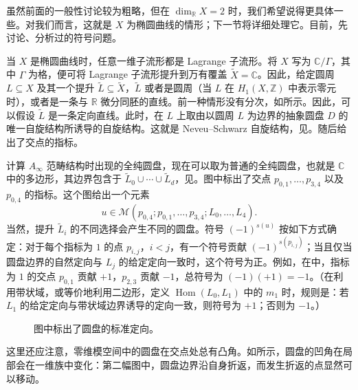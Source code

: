 虽然前面的一般性讨论较为粗略，但在 $\dim_{\mathbb R}X=2$ 时，我们希望说得更具体一些。对我们而言，这就是 $X$ 为椭圆曲线的情形；下一节将详细处理它。目前，先讨论、分析过的符号问题。

当 $X$ 是椭圆曲线时，任意一维子流形都是 Lagrange 子流形。将 $X$ 写为 $\mathbb C/\Gamma$，其中 $\Gamma$ 为格，便可将 Lagrange 子流形提升到万有覆盖 $\widetilde X=\mathbb C$。因此，给定圆周 $L\subseteq X$ 及其一个提升 $\widetilde L\subseteq\widetilde X$，$\widetilde L$ 或者是圆周（当 $L$ 在 $H_1(X,\mathbb Z)$ 中表示零元时），或者是一条与 $\mathbb R$ 微分同胚的直线。前一种情形没有分次，如所示。因此，可以假设 $\widetilde L$ 是一条定向直线。此时，在 $L$ 上取由以圆周 $L$ 为边界的抽象圆盘 $D$ 的唯一自旋结构所诱导的自旋结构。这就是 Neveu--Schwarz 自旋结构，见。随后给出了交点的指标。

计算 $A_\infty$ 范畴结构时出现的全纯圆盘，现在可以取为普通的全纯圆盘，也就是 $\mathbb C$ 中的多边形，其边界包含于 $\widetilde L_0\cup\cdots\cup\widetilde L_d$，见。图中标出了交点 $p_{0,1},\ldots,p_{3,4}$ 以及 $p_{0,4}$ 的指标。这个图给出一个元素
\[
u\in\mathcal M(p_{0,4};p_{0,1},\ldots,p_{3,4};L_0,\ldots,L_4).
\]
当然，提升 $\widetilde L_i$ 的不同选择会产生不同的圆盘。符号 $(-1)^{s(u)}$ 按如下方式确定：对于每个指标为 $1$ 的点 $p_{i,j}$，$i<j$，有一个符号贡献 $(-1)^{s(p_{i,j})}$；当且仅当圆盘边界的自然定向与 $L_j$ 的给定定向一致时，这个符号为正。例如，在中，指标为 $1$ 的交点 $p_{0,1}$ 贡献 $+1$，$p_{2,3}$ 贡献 $-1$，总符号为 $(-1)(+1)=-1$。（在利用带状域，或等价地利用二边形，定义 $\operatorname{Hom}(L_0,L_1)$ 中的 $m_1$ 时，规则是：若 $L_1$ 的给定定向与带状域边界诱导的定向一致，则符号为 $+1$；否则为 $-1$。）

\begin{figure}[H]
\centering
{}
\caption{图中标出了圆盘的标准定向。}\label{fig:8.21}
\end{figure}

这里还应注意，零维模空间中的圆盘在交点处总有凸角。如所示，圆盘的凹角在局部会在一维族中变化：第二幅图中，圆盘边界沿自身折返，而发生折返的点显然可以移动。

\begin{figure}[H]
\centering
{}
\BookNumberOnlyCaption\label{fig:8.22}
\end{figure}

